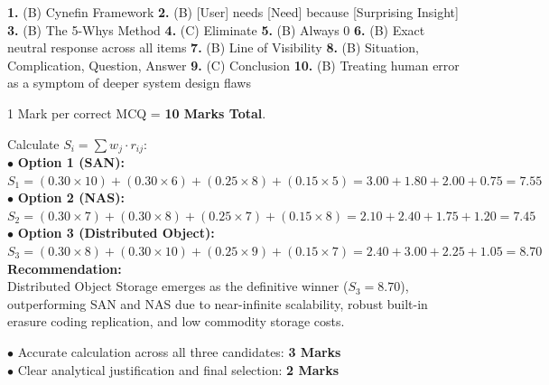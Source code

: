 \begin{solutionbox}
\textbf{1.} (B) Cynefin Framework \quad
\textbf{2.} (B) [User] needs [Need] because [Surprising Insight] \quad
\textbf{3.} (B) The 5-Whys Method \quad
\textbf{4.} (C) Eliminate \quad
\textbf{5.} (B) Always 0 \quad
\textbf{6.} (B) Exact neutral response across all items \quad
\textbf{7.} (B) Line of Visibility \quad
\textbf{8.} (B) Situation, Complication, Question, Answer \quad
\textbf{9.} (C) Conclusion \quad
\textbf{10.} (B) Treating human error as a symptom of deeper system design flaws
\begin{markingrubric}
1 Mark per correct MCQ = \textbf{10 Marks Total}.
\end{markingrubric}
\end{solutionbox}

\begin{solutionbox}
Calculate $S_i = \sum w_j \cdot r_{ij}$:\\
$\bullet$ \textbf{Option 1 (SAN):}\\
$S_1 = (0.30 \times 10) + (0.30 \times 6) + (0.25 \times 8) + (0.15 \times 5) = 3.00 + 1.80 + 2.00 + 0.75 = \mathbf{7.55}$\\
$\bullet$ \textbf{Option 2 (NAS):}\\
$S_2 = (0.30 \times 7) + (0.30 \times 8) + (0.25 \times 7) + (0.15 \times 8) = 2.10 + 2.40 + 1.75 + 1.20 = \mathbf{7.45}$\\
$\bullet$ \textbf{Option 3 (Distributed Object):}\\
$S_3 = (0.30 \times 8) + (0.30 \times 10) + (0.25 \times 9) + (0.15 \times 7) = 2.40 + 3.00 + 2.25 + 1.05 = \mathbf{8.70}$\\
\textbf{Recommendation:}\\
Distributed Object Storage emerges as the definitive winner ($S_3 = 8.70$), outperforming SAN and NAS due to near-infinite scalability, robust built-in erasure coding replication, and low commodity storage costs.
\begin{markingrubric}
$\bullet$ Accurate calculation across all three candidates: \textbf{3 Marks}\\
$\bullet$ Clear analytical justification and final selection: \textbf{2 Marks}
\end{markingrubric}
\end{solutionbox}

